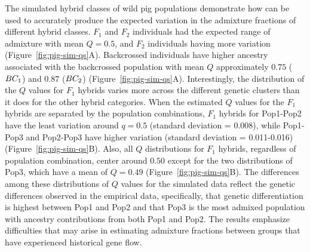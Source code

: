 {The simulated hybrid classes of wild pig populations demonstrate how \gscramble{} can be 
used to accurately produce 
the expected variation in the admixture fractions of different hybrid classes. 
$F_1$ and $F_2$ individuals had the expected range of admixture with 
mean $Q=0.5$, and $F_2$ individuals having
more variation (Figure~\ref{fig:pig-sim-qs}A).
Backcrossed individuals have higher ancestry associated with the backcrossed population with mean $Q$
approximately $0.75$ ($BC_1$) and $0.87$ ($BC_2$) (Figure~\ref{fig:pig-sim-qs}A). Interestingly, the distribution of the $Q$ values for $F_1$ hybrids varies more across the different genetic clusters than it does for the other
hybrid categories.
When the estimated $Q$ values for the $F_1$ hybrids are separated by the population combinations,
$F_1$ hybrids for Pop1-Pop2 have the least variation around $q=0.5$ (standard deviation
= 0.008), while Pop1-Pop3 and Pop2-Pop3
have higher variation (standard deviation = 0.011-0.016) (Figure~\ref{fig:pig-sim-qs}B). Also, all $Q$
distributions for $F_1$ hybrids, regardless of population combination, center around
$0.50$ except for the two distributions
of Pop3, which have a mean of $Q=0.49$ (Figure~\ref{fig:pig-sim-qs}B).
The differences among these
distributions of $Q$ values for the simulated data reflect the genetic differences observed
in the empirical data, specifically, that genetic differentiation is highest between Pop1 and Pop2 and that
Pop3 is the most admixed population with ancestry contributions from both Pop1 and Pop2.
The results emphasize difficulties that may arise in estimating admixture fractions between
groups that have experienced historical gene flow.



}

